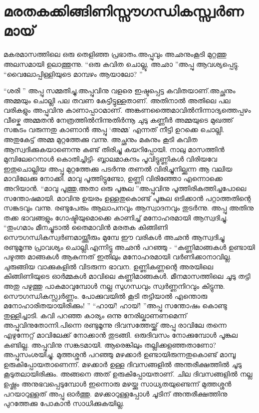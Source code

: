 \chapter{മരതകക്കിങ്ങിണിസ്സൗഗന്ധികസ്സ്വർണമായ്}
\obeylines
മകരമാസത്തിലെ ഒരു തെളിഞ്ഞ പ്രഭാതം.അപ്പുവും അഛനുംകൂടി മുറ്റത്തു അലസമായി ഉലാത്തുന്നു.
“ഒരു കവിത ചൊല്ലൂ, അഛാ ”അപ്പു ആവശ്യപ്പെട്ടു.
“വൈലോപ്പിള്ളിയുടെ മാമ്പഴം ആയാലോ? ”

“ശരി ” അപ്പു സമ്മതിച്ചു.അപ്പുവിനു വളരെ ഇഷ്ടപ്പെട്ട കവിതയാണ്‌.അച്ഛനും അമ്മയും ചൊല്ലി പല തവണ കേട്ടിട്ടുള്ളതാണ്‌. അതിനാൽ അതിലെ പല വരികളും അപ്പുവിനു കാണാപ്പാഠമാണ്‌.
\hspace{2em}അങ്കണത്തൈമാവിൽനിന്നാദ്യത്തെപ്പഴം വീഴ്കെ  
\hspace{2em}അമ്മതൻ നേത്രത്തിൽനിന്നുതിർന്നൂ ചുടു കണ്ണീർ
അമ്മയുടെ മുഖത്ത് സങ്കടം വരുന്നതു കാണാൻ അപ്പു ‘അമ്മ’ എന്നത് നീട്ടി ഉറക്കെ ചൊല്ലി. അതുകേട്ട് അമ്മ മുറ്റത്തേക്കു വന്നു. അച്ഛനും മകനും കൂടി കവിത ആസ്വദിക്കുകയാണെന്നു കണ്ട് തിരിച്ചു കയറിപ്പോയി.
\hspace{2em}നാലു മാസത്തിൻ മുമ്പിലേറെനാൾ കൊതിച്ചിട്ടി-
\hspace{2em}ബ്ബാലമാകന്ദം പൂവിട്ടുണ്ണികൾ വിരിയവേ
ഇതുചൊല്ലിയ അപ്പു മുറ്റത്തേക്കു പടർന്നു തണൽ വിരിച്ചുനില്ക്കുന്ന ആ വലിയ മാവിലേക്കു നോക്കി. മാവു പൂത്തിട്ടുണ്ടോ, ഉണ്ണി വിരിഞ്ഞോ എന്നൊക്കെ അറിയാൻ.
“മാവു പൂത്തു.അതാ ഒരു പൂങ്കുല ”അപ്പുവിനു പൂത്തിരികത്തിച്ചപോലെ സന്തോഷമായി. മാവിനു ഉയരം ഉള്ളതുകൊണ്ട് പൂങ്കുല ഒടിക്കാൻ പറ്റാത്തതിന്റെ സങ്കടവും വന്നു. രണ്ടുപേരും ആലാപനവും ആസ്വാദനവും തുടർന്നു. അപ്പു അതിനു തക്ക ഭാവങ്ങളും ഗോഷ്ടിയുമൊക്കെ കാണിച്ച് മനോഹരമായി ആസ്വദിച്ചു.
\hspace{2em}“തുംഗമാം മീനച്ചൂടാൽ തൈമാവിൻ മരതക
\hspace{2em}കിങ്ങിണി സൌഗന്ധികസ്വർണമായ്ത്തീരും മുമ്പേ
ഈ വരികൾ അഛൻ ആസ്വദിച്ചു രണ്ടുമൂന്നു പ്രാവശ്യം ചൊല്ലി.എന്നിട്ടു അഛൻ പറഞ്ഞു - 
“കണ്ണിമാങ്ങകൾ ഉണ്ടായി പഴുത്ത മാങ്ങകൾ ആകുന്നത് ഇതിലും മനോഹരമായി വർണിക്കാനാവില്ല. ചുരുങ്ങിയ വാക്കുകളിൽ വിടരുന്ന ഭാവന. ഉണ്ണികണ്ണന്റെ അരയിലെ കിങ്ങിണിയുടെ ഓർമ്മകൾ മാവിലെ കണ്ണിമാങ്ങകൾ. മീനമാസത്തിലെ ചൂടു തട്ടി അതു പഴുത്തു പാകമാവുമ്പോൾ നല്ല സുഗന്ധവും സ്വർണ്ണനിറവും കിട്ടുന്നു. സൌഗന്ധികസ്സ്വർണ്ണം. പോക്കുവയിൽ കൂടി തട്ടിയാൽ എന്തൊരു മനോഹാരിതയായിരിക്കും! ”
“ഹായ്! ഹായ്! ”അപ്പു സന്തോഷം കൊണ്ടു തുള്ളിച്ചാടി.
  കവി പറഞ്ഞ കാര്യം ഒന്നു നേരില്കാണണമെന്ന് അപ്പുവിനുതോന്നി.പിന്നെ രണ്ടുമൂന്നു ദിവസത്തേയ്ക്ക് അപ്പു രാവിലേ തന്നെ എഴുന്നേറ്റ് മാവിലേക്ക് നോക്കാൻ തുടങ്ങി. ഒരുദിവസം നോക്കുമ്പോൾ പൂങ്കുല കണ്ടില്ല. അപ്പുവിനു സങ്കടമായി. ആരെങ്കിലും തല്ലിക്കളഞ്ഞതാണോ? അപ്പുസംശയിച്ചു. മുത്തശ്ശൻ പറഞ്ഞു മഴക്കാർ ഉണ്ടായിരുന്നതുകൊണ്ട് മാമ്പൂ ഉരുകിപ്പോയതാണെന്ന്. മഴക്കാർ ഉള്ള ദിവസങ്ങളിൽ അന്തരീക്ഷത്തിൽ ചൂടു കൂടുതലായിരിക്കും. അങ്ങനെ അത് ഉരുകിപ്പോയതാണ്‌. ചില ദിവസങ്ങളിൽ നല്ല ഉഷ്ണം അനുഭവപ്പെടുമ്പോൾ ഇന്നൊരു മഴയ്ക്കു സാധ്യതയുണ്ടെന്ന് മുത്തശ്ശൻ പറയാറുള്ളത് അപ്പു ഓർത്തു. മഴക്കാറുള്ളപ്പോൾ ചൂടിന്‌ അന്തരീക്ഷത്തിനു പുറത്തേക്കു പോകാൻ സാധിക്കുകയില്ല.
